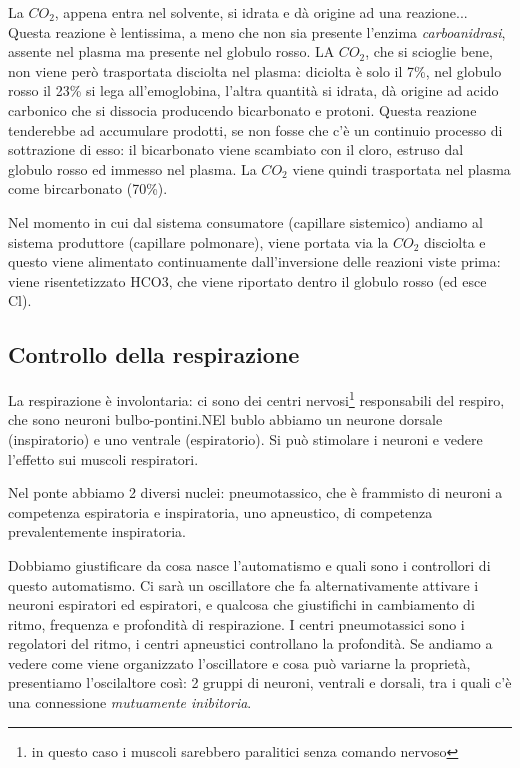 \documentclass[a4paper,12pt]{article}
\begin{document}
La $CO_{2}$, appena entra nel solvente, si idrata e dà origine ad una reazione... Questa reazione è lentissima, a meno che non sia presente l'enzima \emph{carboanidrasi}, assente nel plasma ma presente nel globulo rosso. LA $CO_{2}$, che si scioglie bene, non viene però trasportata disciolta nel plasma: diciolta è solo il 7\%, nel globulo rosso il 23\% si lega all'emoglobina, l'altra quantità si idrata, dà origine ad acido carbonico che si dissocia producendo bicarbonato e protoni. Questa reazione tenderebbe ad accumulare prodotti, se non fosse che c'è un continuio processo di sottrazione di esso: il bicarbonato viene scambiato con il cloro, estruso dal globulo rosso ed immesso nel plasma. La $CO_{2}$ viene quindi trasportata nel plasma come bircarbonato (70\%).

Nel momento in cui dal sistema consumatore (capillare sistemico) andiamo al sistema produttore (capillare polmonare), viene portata via la $CO_{2}$ disciolta e questo viene alimentato continuamente dall'inversione delle reazioni viste prima: viene risentetizzato HCO3, che viene riportato dentro il globulo rosso (ed esce Cl).

\subsection{Controllo della respirazione}
La respirazione è involontaria: ci sono dei centri nervosi\footnote{in questo caso i muscoli sarebbero paralitici senza comando nervoso} responsabili del respiro, che sono neuroni bulbo-pontini.NEl bublo abbiamo un neurone dorsale (inspiratorio) e uno ventrale (espiratorio). Si può stimolare i neuroni e vedere l'effetto sui muscoli respiratori.

Nel ponte abbiamo 2 diversi nuclei: pneumotassico, che è frammisto di neuroni a competenza espiratoria e inspiratoria,  uno apneustico, di competenza prevalentemente inspiratoria.

Dobbiamo giustificare da cosa nasce l'automatismo e quali sono i controllori di questo automatismo. Ci sarà un oscillatore che fa alternativamente attivare i neuroni espiratori ed espiratori, e qualcosa che giustifichi in cambiamento di ritmo, frequenza e profondità di respirazione. I centri pneumotassici sono i regolatori del ritmo, i centri apneustici controllano la profondità. Se andiamo a vedere come viene organizzato l'oscillatore e cosa può variarne la proprietà, presentiamo l'oscilaltore così: 2 gruppi di neuroni, ventrali e dorsali, tra i quali c'è una connessione \emph{mutuamente inibitoria}. 
\end{document}
